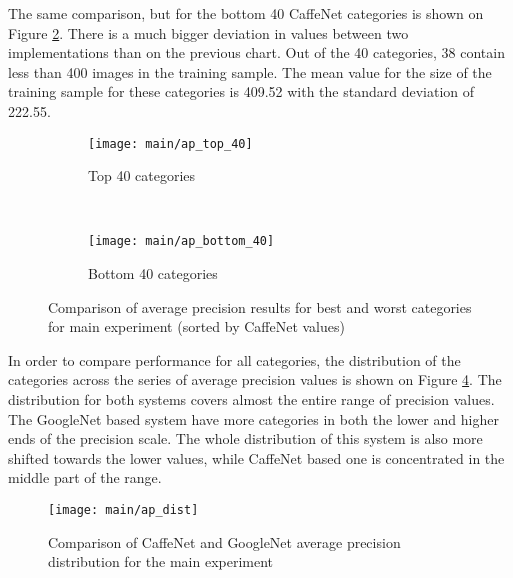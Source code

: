     The same comparison, but for the bottom 40 CaffeNet categories is shown on Figure \ref{fig:main-ap-bottom-40}. There is a much bigger deviation in values between two implementations than on the previous chart. Out of the 40 categories, 38 contain less than 400 images in the training sample. The mean value for the size of the training sample for these categories is 409.52 with the standard deviation of 222.55.  %
    
    
    \begin{figure}[H]
        \centering
        \begin{subfigure}[a]{0.95\textwidth}
            \texttt{[image: main/ap\_top\_40]}
            \caption{Top 40 categories}
            \label{fig:main-ap-top-40}
        \end{subfigure}
        \\
        \begin{subfigure}[a]{0.95\textwidth}
            \texttt{[image: main/ap\_bottom\_40]}
            \caption{Bottom 40 categories}
            \label{fig:main-ap-bottom-40}
        \end{subfigure}
        \caption{Comparison of average precision results for best and worst categories for main experiment (sorted by CaffeNet values)}
        \label{fig:main-ap}
    \end{figure}
    
    In order to compare performance for all categories, the distribution of the categories across the series of average precision values is shown on Figure \ref{fig:main-ap-dist}. The distribution for both systems covers almost the entire range of precision values. The GoogleNet based system have more categories in both the lower and higher ends of the precision scale. The whole distribution of this system is also more shifted towards the lower values, while CaffeNet based one is concentrated in the middle part of the range.
    
    \begin{figure}[H]
        \centering
        \texttt{[image: main/ap\_dist]}
        \caption{Comparison of CaffeNet and GoogleNet average precision distribution for the main experiment}
        \label{fig:main-ap-dist}
    \end{figure}
    
